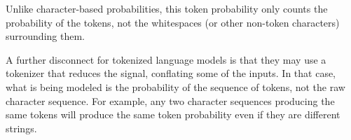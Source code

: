 Unlike character-based probabilities, this token probability only
counts the probability of the tokens, not the whitespaces (or other
non-token characters) surrounding them.  

A further disconnect for tokenized language models is that they may
use a tokenizer that reduces the signal, conflating some of the
inputs.  In that case, what is being modeled is the probability of
the sequence of tokens, not the raw character sequence.  For example,
any two character sequences producing the same tokens will produce
the same token probability even if they are different strings.
